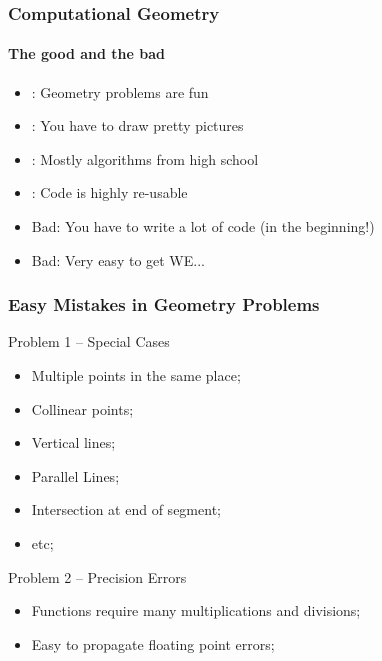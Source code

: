 \documentclass{beamer}
\begin{document}
\begin{frame}
  \frametitle{Computational Geometry}
  \framesubtitle{The good and the bad}

  \begin{itemize}
  \item {}: Geometry problems are fun
  \item {}: You have to draw pretty pictures
  \item {}: Mostly algorithms from high school
  \item {}: Code is highly re-usable
    
    \bigskip

  \item \alert{Bad}: You have to write a lot of code (in the beginning!)
  \item \alert{Bad}: Very easy to get WE...
  \end{itemize}
\end{frame}


\begin{frame}
  \frametitle{Easy Mistakes in Geometry Problems}

  {\small
    \begin{block}{Problem 1 -- Special Cases}
      \begin{itemize}
      \item Multiple points in the same place;
      \item Collinear points;
      \item Vertical lines;
      \item Parallel Lines;
      \item Intersection at end of segment;
      \item etc;
      \end{itemize}
    \end{block}

    \begin{block}{Problem 2 -- Precision Errors}
      \begin{itemize}
      \item Functions require many multiplications and divisions;
      \item Easy to propagate floating point errors;
      \end{itemize}
    \end{block}
  }
\end{frame}
\end{document}
